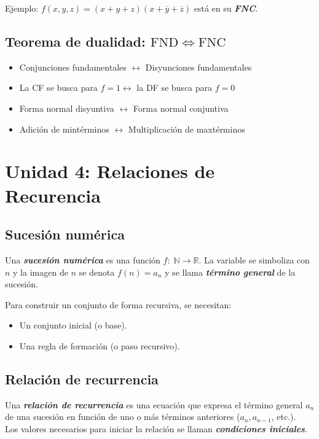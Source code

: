 \documentclass[11pt,a4paper]{article}   %
\newcommand{\N}{\mathbb{N}}              %
\begin{document}
Ejemplo: $f(x,y,z) = (x + y + z) (x + \overline{y} + \overline{z})$ está en su \textit{\textbf{FNC}}.

\subsection{Teorema de dualidad: \texorpdfstring{$\mathrm{FND}\Leftrightarrow\mathrm{FNC}$}{FND ↔ FNC}}
\begin{itemize}
    \item Conjunciones fundamentales $\leftrightarrow$ Disyunciones fundamentales
    \item La CF se busca para $f = 1 \leftrightarrow$ la DF se busca para $f = 0$
    \item Forma normal disyuntiva $\leftrightarrow$ Forma normal conjuntiva
    \item Adición de mintérminos $\leftrightarrow$ Multiplicación de maxtérminos
\end{itemize}

\newpage
\section{Unidad 4: Relaciones de Recurencia}

\subsection{Sucesión numérica}
Una \textit{\textbf{sucesión numérica}} es una función $f:\; \N \to \mathbb{R} $.
La variable se simboliza con $n$ y la imagen de $n$ se denota $f(n) = a_n$ y se llama \textit{\textbf{término general}} de la sucesión.

\begin{tcolorbox}[colback=pink!5!white,colframe=pink!75!black,title=Recursividad]
Para construir un conjunto de forma recursiva, se necesitan:
\begin{itemize}
    \item Un conjunto inicial (o base).
    \item Una regla de formación (o paso recursivo).
\end{itemize}
\end{tcolorbox}

\subsection{Relación de recurrencia}
Una \textit{\textbf{relación de recurrencia}} es una ecuación que expresa el término general $a_n$ de una sucesión en función de uno o más términos anteriores ($a_n, a_{n-1}$, etc.).\\
Los valores necesarios para iniciar la relación se llaman \textit{\textbf{condiciones iniciales}}.
\end{document}
